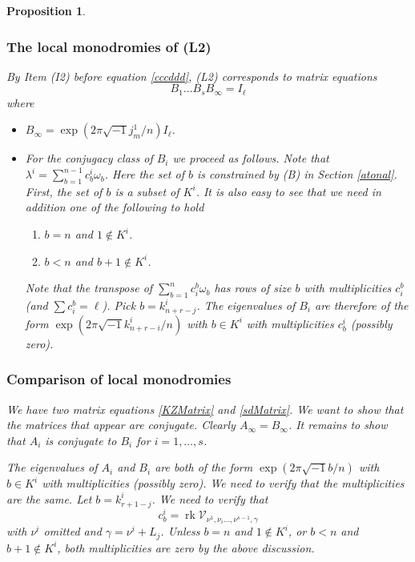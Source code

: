 \documentclass[11pt]{amsart}
\newcommand\rk{\operatorname{rk}}
\newtheorem{proposition}[theorem]{Proposition}
\numberwithin{theorem}{subsection}
\begin{document}
{\begin{proposition}
\subsubsection{The local monodromies of (L2)}
By Item (I2) before equation \eqref{cccddd}, (L2) corresponds to matrix equations
\begin{equation}\label{sdMatrix}
B_1\dots B_s B_{\infty}=I_{\ell}
\end{equation}
 where
\begin{itemize}
\item  $B_{\infty}=\exp(2\pi\sqrt{-1}j^1_m/n)I_{\ell}$.
\item For the conjugacy class of $B_i$ we proceed as follows. Note that $\lambda^i=\sum_{b=1}^{n-1} c^i_b\omega_b$. Here the set of $b$ is constrained  by (B) in Section \ref{atonal}. First, the set of $b$ is a subset of $K^i$. It is also easy to see that we need in addition one of the following to hold
\begin{enumerate}
\item  $b=n$ and $1\not\in K^i$.
\item $b<n$ and $b+1\not\in K^i$.
\end{enumerate}
Note that the transpose of $\sum_{b=1}^n c^b_i\omega_b$ has rows of size $b$ with multiplicities $c^b_i$ (and $\sum c^b_i=\ell$).  Pick $b=k^i_{n+r-j}$. The eigenvalues of $B_i$ are therefore of the form $\exp(2\pi\sqrt{-1}k^i_{n+r-i}/n)$ with $b\in K^i$ with multiplicities $c^i_b$ (possibly zero).
\end{itemize}
\subsubsection{Comparison of local monodromies}
We have two matrix equations \eqref{KZMatrix} and \eqref{sdMatrix}. We want to show that the matrices that appear are conjugate.
Clearly $A_{\infty}=B_{\infty}$. It remains to show that $A_i$ is conjugate to $B_i$ for $i=1,\dots,s$.

The eigenvalues of $A_i$ and $B_i$ are both of the form $\exp(2\pi\sqrt{-1}b/n)$ with $b\in K^i$ with multiplicities (possibly zero). We need to verify that the multiplicities are the same.
Let $b=k^i_{r+1-j}$. We need to verify that
\begin{equation}\label{desiree}
c^i_b=\rk \mathcal{V}_{\nu^1,\widehat{\nu_i}\dots,\nu^{s-1},\gamma}
\end{equation}
with $\nu^i$ omitted and $\gamma=\nu^i+L_j$. Unless $b=n$ and $1\not\in K^i$, or $b<n$ and $b+1\not\in K^i$, both multiplicities are zero by the above discussion.


\end{proposition}}
\end{document}
